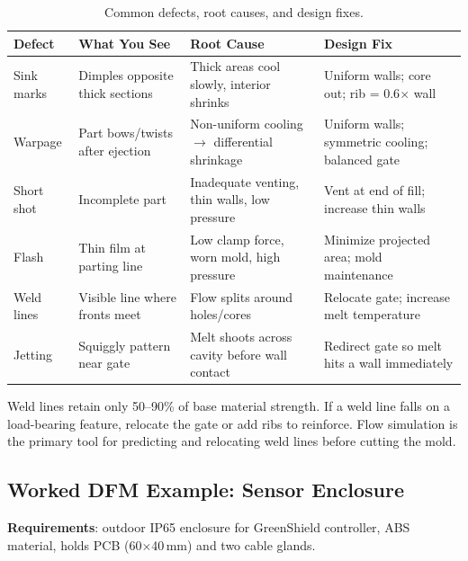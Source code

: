 \begin{table}[htbp]
\centering\small
\begin{tabularx}{\textwidth}{l l X X}
  \toprule
  \textbf{Defect} & \textbf{What You See} & \textbf{Root Cause} & \textbf{Design Fix} \\
  \midrule
  Sink marks & Dimples opposite thick sections & Thick areas cool slowly, interior shrinks & Uniform walls; core out; rib = 0.6$\times$ wall \\
  Warpage & Part bows/twists after ejection & Non-uniform cooling $\to$ differential shrinkage & Uniform walls; symmetric cooling; balanced gate \\
  Short shot & Incomplete part & Inadequate venting, thin walls, low pressure & Vent at end of fill; increase thin walls \\
  Flash & Thin film at parting line & Low clamp force, worn mold, high pressure & Minimize projected area; mold maintenance \\
  Weld lines & Visible line where fronts meet & Flow splits around holes/cores & Relocate gate; increase melt temperature \\
  Jetting & Squiggly pattern near gate & Melt shoots across cavity before wall contact & Redirect gate so melt hits a wall immediately \\
  \bottomrule
\end{tabularx}
\caption{Common defects, root causes, and design fixes.}
\end{table}

\begin{tipbox}
Weld lines retain only 50--90\% of base material strength. If a weld line falls on a load-bearing feature, relocate the gate or add ribs to reinforce. Flow simulation is the primary tool for predicting and relocating weld lines before cutting the mold.
\end{tipbox}



\subsection{Worked DFM Example: Sensor Enclosure}
\textbf{Requirements}: outdoor IP65 enclosure for GreenShield controller, ABS material, holds PCB (60$\times$40\,mm) and two cable glands.

